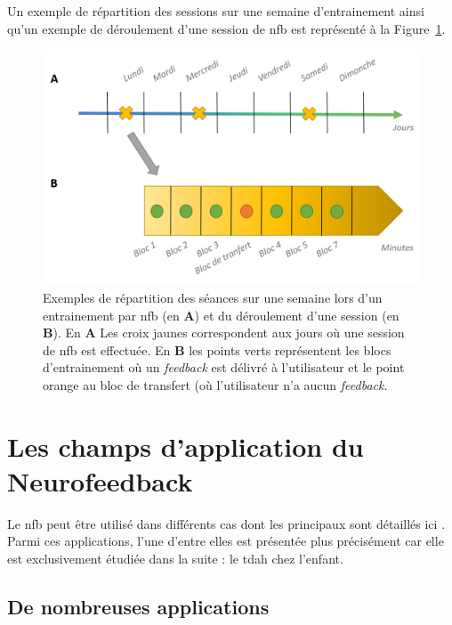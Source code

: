 Un exemple de répartition des sessions sur une semaine d'entrainement ainsi qu'un exemple de déroulement d'une session de \gls{nfb} est représenté à la
Figure~\ref{Figure:introduction_timeline_session}. 

\begin{figure}[h!]
  \centering
	\includegraphics[width=1\linewidth]{figures/chapter-1/introduction-timeline-session} 
  \caption[Exemple de déroulement d'un traitement par \gls{nfb}.]{Exemples de répartition 
	des séances sur une semaine lors d'un entrainement par \gls{nfb} (en \textbf{A}) et du déroulement d'une session (en \textbf{B}). 
	En \textbf{A} Les croix jaunes correspondent aux jours où une session de \gls{nfb} est effectuée. En \textbf{B} les points verts représentent les blocs d'entrainement où un \textit{feedback}
	est délivré à l'utilisateur et le point orange au bloc de transfert (où l'utilisateur n'a aucun \textit{feedback}.}
  \label{Figure:introduction_timeline_session}
\end{figure}

\section{Les champs d'application du Neurofeedback} \label{applications_NFB}

Le \gls{nfb} peut être utilisé dans différents cas dont les principaux sont détaillés ici \citep{Marzbani2016}. Parmi ces applications, l'une d'entre elles est présentée 
plus précisément car elle est exclusivement étudiée dans la suite : le \gls{tdah} chez l'enfant.

\subsection{De nombreuses applications} \label{NFB_applications}

